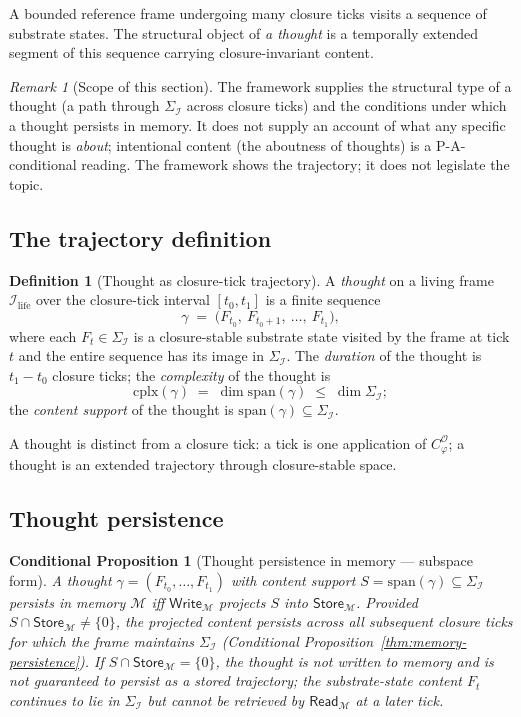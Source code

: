 \documentclass[11pt]{article}
\theoremstyle{plain}
\newtheorem{conditional}[theorem]{Conditional Proposition}
\theoremstyle{definition}
\newtheorem{definition}[theorem]{Definition}
\theoremstyle{remark}
\newtheorem{remark}[theorem]{Remark}
\newcommand{\Ical}{\mathcal{I}}
\newcommand{\Ocal}{\mathcal{O}}
\newcommand{\Mcal}{\mathcal{M}}
\newcommand{\Cph}{C_\varphi}
\newcommand{\Ilife}{\Ical_{\mathrm{life}}}
\begin{document}
A bounded reference frame undergoing many closure ticks visits a sequence of substrate states. The structural object of \emph{a thought} is a temporally extended segment of this sequence carrying closure-invariant content.

\begin{remark}[Scope of this section]\label{rem:thoughts-scope}
The framework supplies the structural type of a thought (a path through $\Sigma_\Ical$ across closure ticks) and the conditions under which a thought persists in memory. It does not supply an account of what any specific thought is \emph{about}; intentional content (the aboutness of thoughts) is a P-A-conditional reading. The framework shows the trajectory; it does not legislate the topic.
\end{remark}

\subsection{The trajectory definition}

\begin{definition}[Thought as closure-tick trajectory]\label{def:thought}
A \emph{thought} on a living frame $\Ilife$ over the closure-tick interval $[t_0, t_1]$ is a finite sequence
\[
  \gamma \;=\; \big(F_{t_0},\ F_{t_0 + 1},\ \ldots,\ F_{t_1}\big),
\]
where each $F_t \in \Sigma_\Ical$ is a closure-stable substrate state visited by the frame at tick $t$ and the entire sequence has its image in $\Sigma_\Ical$. The \emph{duration} of the thought is $t_1 - t_0$ closure ticks; the \emph{complexity} of the thought is
\[
  \mathrm{cplx}(\gamma) \;=\; \dim \mathrm{span}(\gamma) \;\leq\; \dim \Sigma_\Ical;
\]
the \emph{content support} of the thought is $\mathrm{span}(\gamma) \subseteq \Sigma_\Ical$.
\end{definition}

A thought is distinct from a closure tick: a tick is one application of $\Cph^\Ocal$; a thought is an extended trajectory through closure-stable space.

\subsection{Thought persistence}

\begin{conditional}[Thought persistence in memory --- subspace form]\label{thm:thought-persistence}
A thought $\gamma = (F_{t_0}, \ldots, F_{t_1})$ with content support $S = \mathrm{span}(\gamma) \subseteq \Sigma_\Ical$ persists in memory $\Mcal$ iff $\mathsf{Write}_\Mcal$ projects $S$ into $\mathsf{Store}_\Mcal$. Provided $S \cap \mathsf{Store}_\Mcal \neq \{0\}$, the projected content persists across all subsequent closure ticks for which the frame maintains $\Sigma_\Ical$ (Conditional Proposition~\ref{thm:memory-persistence}). If $S \cap \mathsf{Store}_\Mcal = \{0\}$, the thought is not written to memory and is not guaranteed to persist as a stored trajectory; the substrate-state content $F_t$ continues to lie in $\Sigma_\Ical$ but cannot be retrieved by $\mathsf{Read}_\Mcal$ at a later tick.
\end{conditional}
\end{document}
